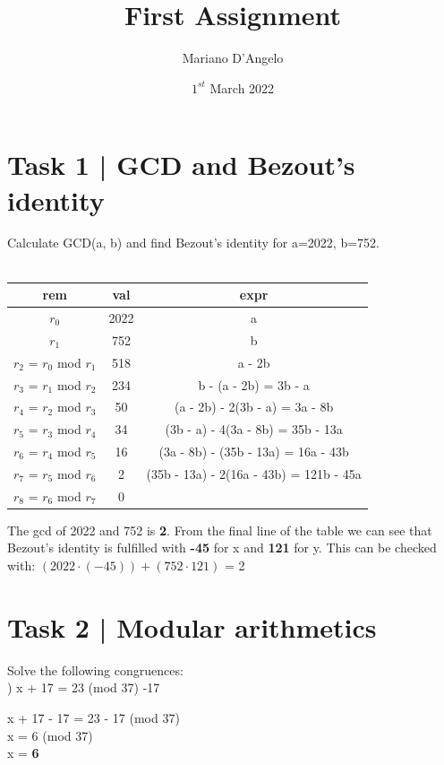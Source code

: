 \documentclass[12pt]{article}
\title{First Assignment}
\author{Mariano D'Angelo}
\date{$1^{st}$ March 2022}
\begin{document}
\maketitle


\section*{Task 1 | GCD and Bezout's identity}
Calculate GCD(a, b) and find Bezout's identity for a=2022, b=752. \\\\
\begin{tabular}{ | c | c | c | } \hline
    \textbf{rem} & \textbf{val} & \textbf{expr} \\ \hline
    $r_0$ & 2022 & a \\
    $r_1$ & 752 & b \\
    $r_2$ = $r_0$ mod $r_1$ & 518 & a - 2b \\
    $r_3$ = $r_1$ mod $r_2$ & 234 & b - (a - 2b) = 3b - a \\
    $r_4$ = $r_2$ mod $r_3$ & 50 & (a - 2b) - 2(3b - a) = 3a - 8b \\
    $r_5$ = $r_3$ mod $r_4$ & 34 & (3b - a) - 4(3a - 8b) = 35b - 13a \\
    $r_6$ = $r_4$ mod $r_5$ & 16 & (3a - 8b) - (35b - 13a) = 16a - 43b \\
    $r_7$ = $r_5$ mod $r_6$ & 2 & (35b - 13a) - 2(16a - 43b) = 121b - 45a \\ \hline
    $r_8$ = $r_6$ mod $r_7$ & 0 & \\ \hline
\end{tabular}

\noindent \newline \newline The gcd of 2022 and 752 is \textbf{2}. \newline
From the final line of the table we can see that Bezout's identity is fulfilled
with \textbf{-45} for x and \textbf{121} for y.\newline
This can be checked with: $(2022 \cdot (-45)) + (752 \cdot 121)$ = 2

\pagebreak


\section*{Task 2 | Modular arithmetics} 

Solve the following congruences: \\

) x + 17 = 23 (mod 37) \textbar{} -17
\begin{addmargin}[1.22em]{0em}
x + 17 - 17 = 23 - 17 (mod 37) \\
x = 6 (mod 37) \\
x = \textbf{6} \\
\end{addmargin}
\end{document}
